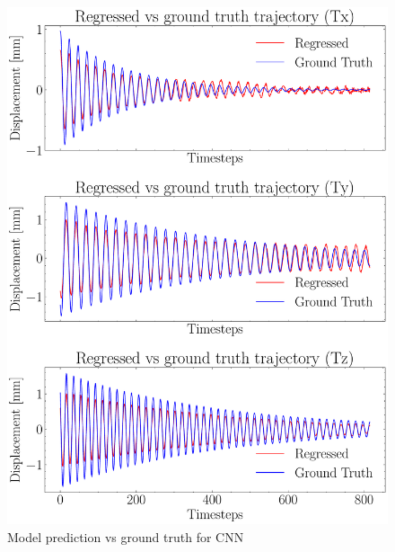 \begin{figure}[H]
    \centering
    \includegraphics[scale=0.53]{images/fig_chapter4/nn_related/predicted_vs_ground_truth_cnn.pdf}
    \caption{Model prediction vs ground truth for CNN}
    \label{fig:cnn_op_vs_gt}
\end{figure}


